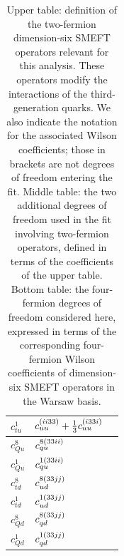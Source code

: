\documentclass[withindex,glossary]{cam-thesis}
\newcommand*{\tmp}[4]{\ensuremath{%
    {#4%
    \ifx\empty#3\empty\ifx\empty#1\empty\else^{#1}\fi\else^{#1(#3)}\fi%
    \ifx\empty#2\empty\else_{#2}\fi}%
}}
\newcommand*{\ccc}[4][]{\tmp{#2}{#3}{#4}{#1{c}}}
\begin{document}
\begin{table}[htbp]
\begin{center}
{\begin{tabular}{lll}
    $c_{tu}^{1}$        &   $ \ccc{}{uu}{ii33} +\frac{1}{3} \ccc{}{uu}{i33i} $ \\   \hline
    $c_{Qu}^{8}$         &  $  \ccc{8}{qu}{33ii}$\\     \hline
    $c_{Qu}^{1}$     &  $  \ccc{1}{qu}{33ii}$  \\     \hline
    $c_{td}^{8}$        &   $\ccc{8}{ud}{33jj}$ \\    \hline
    $c_{td}^{1}$          &  $ \ccc{1}{ud}{33jj}$ \\     \hline
    $c_{Qd}^{8}$        &   $ \ccc{8}{qd}{33jj}$ \\     \hline
    $c_{Qd}^{1}$         &   $ \ccc{1}{qd}{33jj}$\\
         \bottomrule
\end{tabular}
}
\end{center}
  \caption{Upper table:  definition of the two-fermion dimension-six
    SMEFT operators relevant for this analysis.
    These operators modify the interactions of the third-generation
    quarks.
    We also indicate the notation for the associated Wilson coefficients; those
    in brackets are not degrees of freedom entering the fit.
    Middle table: the two additional degrees of freedom
    used in the fit involving two-fermion operators, defined in terms
    of the coefficients of the upper table.
    Bottom table:
    the four-fermion degrees of freedom considered here,
    expressed in terms of the corresponding four-fermion Wilson coefficients
    of dimension-six SMEFT operators in the Warsaw basis.
    \label{tab:ops}}
\end{table}
\end{document}

